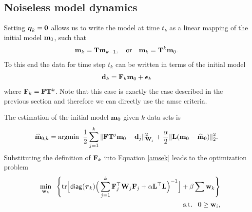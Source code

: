 \documentclass[11pt]{article}
\newcommand{\bfF}	{{\bf{F}}}
\newcommand{\bfI}	{{\bf{I}}}
\newcommand{\bfL}	{{\bf{L}}}
\newcommand{\bfT}	{{\bf{T}}}
\newcommand{\bfW}	{{\bf{W}}}
\newcommand{\bfd}	{{\bf{d}}}
\newcommand{\bfe}	{{\bf{e}}}
\newcommand{\bfm}	{{\bf{m}}}
\newcommand{\bfw}	{{\bf{w}}}
\newcommand{\hf}        {{\frac 12}}
\newcommand{\bfepsilon} {{\boldsymbol \epsilon}}
\newcommand{\bfeta}     {{\boldsymbol \eta}}
\newcommand{\bftau}      {{\boldsymbol \tau}}
\newcommand{\LtL}       { \bfL^{\top}\bfL}
\newcommand {\zero}  { {\bf 0} }
\renewcommand{\hf}		 {\frac12}
\newcommand{\bfmhat}    {{\widehat{\bfm}}}
\begin{document}
\subsection{Noiseless model dynamics}

Setting $\bfeta_k = \zero$ allows us to 
write the model at time $t_k$ as a linear mapping of the initial model $\bfm_0$, such that
\begin{eqnarray*}
\bfm_{k} = \bfT\bfm_{k-1}, \quad {\rm or } \quad
\bfm_{k} = \bfT^{k}\bfm_0.
\end{eqnarray*} 
To this end the data for time step $t_k$ can be written in terms of the initial model 
\begin{equation}
\bfd_k = \bfF_k\bfm_0 + \bfepsilon_k
\end{equation}
where $\bfF_k = \bfF\bfT^{k}$.
Note that this case is exactly the case described in the previous section and therefore we can
directly use the amse criteria.

The estimation of the initial model $\bfm_0$ given $k$ data sets is 
\begin{equation}
\bfmhat_{0,k} ={\rm argmin } \;\; \hf  \sum_{j=1}^{k}\| \bfF\bfT^{j}\bfm_0 - \bfd_j \|_{\bfW_j}^2 + \frac{\alpha}{2}\|\bfL(\bfm_0 - \bfmhat_{0})\|_2^2.
\end{equation}
Substituting the definition of $\bfF_k$ into Equation \eqref{amsek} leads to the optimization problem
\begin{eqnarray}
\label{eq:noiselessOpt}
\nonumber
 &&\min_{\bfw_k}\;\;\Bigg \{\text{tr}\Big[ {\sf diag}(\bftau_{k}) \Big(\sum_{j=1}^{k}\bfF_{j}^{\top}\bfW_{j}\bfF_{j}   +
\alpha \LtL\Big)^{-1}\Big] + \beta \sum \bfw_k \Bigg \}\\
 &&\text{ s.t.} \;\;\;0 \geq \bfw_i,
\end{eqnarray}

\end{document}
